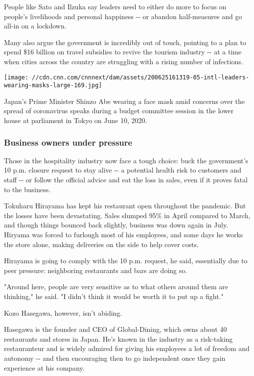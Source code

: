 People like Sato and Ilzuka say leaders need to either do more to focus
on people's livelihoods and personal happiness -\/- or abandon
half-measures and go all-in on a lockdown.

Many also argue the government is incredibly out of touch, pointing to a
plan to spend \$16 billion on travel subsidies to revive the tourism
industry -\/- at a time when cities across the country are struggling
with a rising number of infections.

\texttt{[image: //cdn.cnn.com/cnnnext/dam/assets/200625161319-05-intl-leaders-wearing-masks-large-169.jpg]}

Japan's Prime Minister Shinzo Abe wearing a face mask amid concerns over
the spread of coronavirus speaks during a budget committee session in
the lower house at parliament in Tokyo on June 10, 2020.

\hypertarget{business-owners-under-pressure}{%
\subsubsection{Business owners under
pressure}\label{business-owners-under-pressure}}

Those in the hospitality industry now face a tough choice: buck the
government's 10 p.m. closure request to stay alive -\/- a potential
health risk to customers and staff -\/- or follow the official advice
and eat the loss in sales, even if it proves fatal to the business.

Tokuharu Hirayama has kept his restaurant open throughout the pandemic.
But the losses have been devastating. Sales slumped 95\% in April
compared to March, and though things bounced back slightly, business was
down again in July. Hiryama was forced to furlough most of his
employees, and some days he works the store alone, making deliveries on
the side to help cover costs.

Hirayama is going to comply with the 10 p.m. request, he said,
essentially due to peer pressure: neighboring restaurants and bars are
doing so.

"Around here, people are very sensitive as to what others around them
are thinking," he said. "I didn't think it would be worth it to put up a
fight."

Kozo Hasegawa, however, isn't abiding.

Hasegawa is the founder and CEO of Global-Dining, which owns about 40
restaurants and stores in Japan. He's known in the industry as a
risk-taking restauranteur and is widely admired for giving his employees
a lot of freedom and autonomy -\/- and then encouraging then to go
independent once they gain experience at his company.

